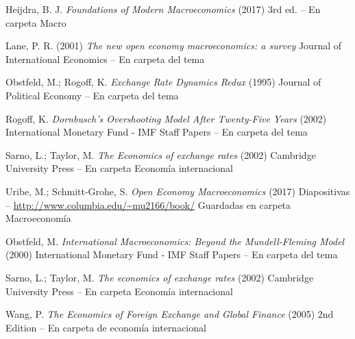 \documentclass{nuevotema}
\begin{document}
Heijdra, B. J. \textit{Foundations of Modern Macroeconomics} (2017) 3rd ed. -- En carpeta Macro

Lane, P. R. (2001) \textit{The new open economy macroeconomics: a survey} Journal of International Economics -- En carpeta del tema

Obstfeld, M.; Rogoff, K. \textit{Exchange Rate Dynamics Redux} (1995) Journal of Political Economy -- En carpeta del tema

Rogoff, K. \textit{Dornbusch's Overshooting Model After Twenty-Five Years} (2002) International Monetary Fund - IMF Staff Papers -- En carpeta del tema

Sarno, L.; Taylor, M. \textit{The Economics of exchange rates} (2002) Cambridge University Press -- En carpeta Economía internacional

Uribe, M.; Schmitt-Grohe, S. \textit{Open Economy Macroeconomics} (2017) Diapositivas -- \url{http://www.columbia.edu/~mu2166/book/} Guardadas en carpeta Macroeconomía

Obstfeld, M. \textit{International Macroeconomics: Beyond the Mundell-Fleming Model} (2000) International Monetary Fund - IMF Staff Papers -- En carpeta del tema

Sarno, L.; Taylor, M. \textit{The economics of exchange rates} (2002) Cambridge University Press -- En carpeta Economía internacional

Wang, P. \textit{The Economics of Foreign Exchange and Global Finance} (2005) 2nd Edition -- En carpeta de economía internacional
\end{document}
